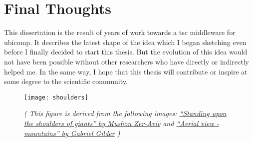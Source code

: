 \section{Final Thoughts}


This dissertation is the result of years of work towards a \acl{tsc} middleware for \acl{ubicomp}.
It describes the latest shape of the idea which I began sketching even before I finally decided to start this thesis.
But the evolution of this idea would not have been possible without other researchers who have directly or indirectly helped me. %
In the same way, I hope that this thesis will contribute or inspire at some degree to the scientific community.


\begin{figure}[h]
    \centering
    \texttt{[image: shoulders]}
    \caption*{}{
      \vspace{-10pt}
      \vspace{-12pt}
      \footnotesize {
	\textit{
	  ( This figure is derived from the following images:
	  \href{http://www.flickr.com/photos/mushon/282287572/}{``Standing upon the shoulders of giants'' by Mushon Zer-Aviv}
	  and
	  \href{http://www.flickr.com/photos/futurefashion/130994094/}{``Aerial view - mountains'' by Gabriel Gilder} )
	}
      }
    }
    \label{fig:shouldersOfGiants}
\end{figure}